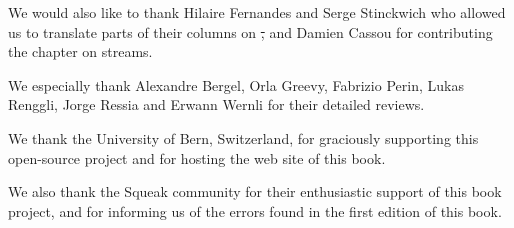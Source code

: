 \documentclass[a4paper,10pt,twoside]{book}
\begin{document}
We would also like to thank Hilaire Fernandes and Serge Stinckwich who allowed us to translate parts of their columns on \st, and Damien Cassou for contributing the chapter on streams.

We especially thank Alexandre Bergel, Orla Greevy, Fabrizio Perin, Lukas Renggli, Jorge Ressia and Erwann Wernli for their detailed reviews.

We thank the University of Bern, Switzerland, for graciously supporting this open-source project and for hosting the web site of this book.

We also thank the Squeak community for their enthusiastic support of this book project, and for informing us of the errors found in the first edition of this book.

\ifx\wholebook\relax\else
   
   
\end{document}
